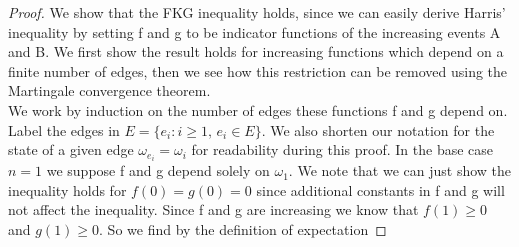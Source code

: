 \documentclass[a4paper,11pt]{article}
\theoremstyle{definition}
\newcommand{\prob}{\mathbb{P}_p}
\begin{document}
\begin{proof}
	
	
	

	We show that the FKG inequality holds, since we can easily derive Harris' inequality by setting f and g to be indicator functions of the increasing events A and B.
	We first show the result holds for increasing functions which depend on a finite number of edges, then we see how this restriction can be removed using the Martingale convergence theorem.\\
	We work by induction on the number of edges these functions f and g depend on.
	Label the edges in $E = \{e_i : i \geq 1 \text{, } e_i \in E\}$.
	We also shorten our notation for the state of a given edge $\omega_{e_i} = \omega_i$ for readability during this proof.
	In the base case $n = 1$ we suppose f and g depend solely on $\omega_1$.
	We note that we can just show the inequality holds for $f(0) = g(0) = 0$ since additional constants in f and g will not affect the inequality. 
	Since f and g are increasing we know that $f(1) \geq 0$ and $g(1) \geq 0$.
	So we find by the definition of expectation 


\end{proof}
\end{document}
